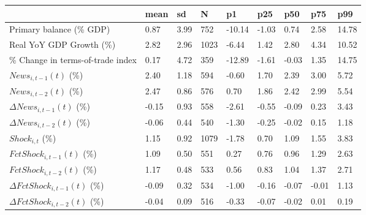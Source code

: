 \begin{table}[htbp]
\begin{tabular}{|l|l|l|l|l|l|l|l|l|}\hline  
 & mean  & sd  & N  & p1  & p25  & p50  & p75  & p99  \\ \hline  
Primary balance (\% GDP) &      0.87 &      3.99 &       752 &    -10.14 &     -1.03 &      0.74 &      2.58 &     14.78 \\ \hline 
Real YoY GDP Growth (\%) &      2.82 &      2.96 &      1023 &     -6.44 &      1.42 &      2.80 &      4.34 &     10.52 \\ \hline 
\% Change in terms-of-trade index &      0.17 &      4.72 &       359 &    -12.89 &     -1.61 &     -0.03 &      1.35 &     14.75 \\ \hline 
$ News_{i,t-1}(t)$ (\%) &      2.40 &      1.18 &       594 &     -0.60 &      1.70 &      2.39 &      3.00 &      5.72 \\ \hline 
$ News_{i,t-2}(t)$ (\%) &      2.47 &      0.86 &       576 &      0.70 &      1.86 &      2.42 &      2.99 &      5.54 \\ \hline 
$ \Delta News_{i,t-1}(t)$ (\%) &     -0.15 &      0.93 &       558 &     -2.61 &     -0.55 &     -0.09 &      0.23 &      3.43 \\ \hline 
$ \Delta News_{i,t-2}(t)$ (\%) &     -0.06 &      0.44 &       540 &     -1.30 &     -0.25 &     -0.02 &      0.15 &      1.18 \\ \hline 
$ Shock_{i,t}$ (\%) &      1.15 &      0.92 &      1079 &     -1.78 &      0.70 &      1.09 &      1.55 &      3.83 \\ \hline 
$ FctShock_{i,t-1}(t)$ (\%) &      1.09 &      0.50 &       551 &      0.27 &      0.76 &      0.96 &      1.29 &      2.63 \\ \hline 
$ FctShock_{i,t-2}(t)$ (\%) &      1.17 &      0.48 &       533 &      0.56 &      0.83 &      1.04 &      1.37 &      2.71 \\ \hline 
$ \Delta FctShock_{i,t-1}(t)$ (\%) &     -0.09 &      0.32 &       534 &     -1.00 &     -0.16 &     -0.07 &     -0.01 &      1.13 \\ \hline 
$ \Delta FctShock_{i,t-2}(t)$ (\%) &     -0.04 &      0.09 &       516 &     -0.33 &     -0.07 &     -0.02 &      0.01 &      0.19 \\ \hline 
  \end{tabular}
\end{table}
